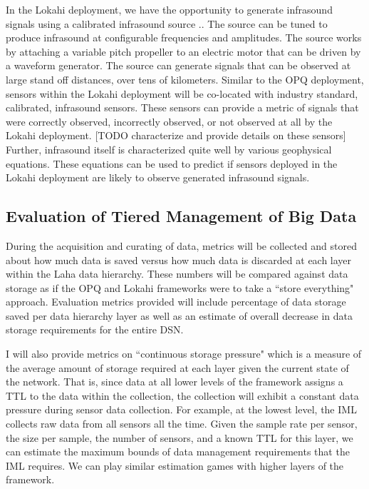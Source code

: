 In the Lokahi deployment, we have the opportunity to generate infrasound signals using a calibrated infrasound source \cite{park2009rotary}.. The source can be tuned to produce infrasound at configurable frequencies and amplitudes. The source works by attaching a variable pitch propeller to an electric motor that can be driven by a waveform generator. The source can generate signals that can be observed at large stand off distances, over tens of kilometers. Similar to the OPQ deployment, sensors within the Lokahi deployment will be co-located with industry standard, calibrated, infrasound sensors. These sensors can provide a metric of signals that were correctly observed, incorrectly observed, or not observed at all by the Lokahi deployment. [TODO characterize and provide details on these sensors] Further, infrasound itself is characterized quite well by various geophysical equations. These equations can be used to predict if sensors deployed in the Lokahi deployment are likely to observe generated infrasound signals.

\subsection{Evaluation of Tiered Management of Big Data}\label{eval-big-data}
During the acquisition and curating of data, metrics will be collected and stored about how much data is saved versus how much data is discarded at each layer within the Laha data hierarchy. These numbers will be compared against data storage as if the OPQ and Lokahi frameworks were to take a ``store everything" approach. Evaluation metrics provided will include percentage of data storage saved per data hierarchy layer as well as an estimate of overall decrease in data storage requirements for the entire DSN. 

I will also provide metrics on ``continuous storage pressure" which is a measure of the average amount of storage required at each layer given the current state of the network. That is, since data at all lower levels of the framework assigns a TTL to the data within the collection, the collection will exhibit a constant data pressure during sensor data collection. For example, at the lowest level, the IML collects raw data from all sensors all the time. Given the sample rate per sensor, the size per sample, the number of sensors, and a known TTL for this layer, we can estimate the maximum bounds of data management requirements that the IML requires. We can play similar estimation games with higher layers of the framework.

